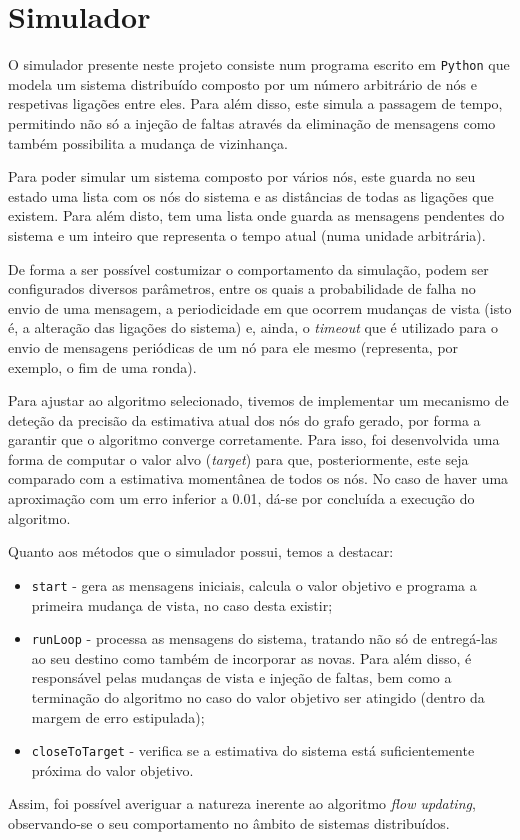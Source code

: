 \documentclass[a4paper]{report}
\begin{document}
{\let\clearpage\relax \chapter{Simulador} \label{ch:Simulator}}
\large{
	O simulador presente neste projeto consiste num programa escrito em \texttt{Python} que modela um sistema distribuído composto por um número arbitrário de nós e respetivas ligações entre eles.
	Para além disso, este simula a passagem de tempo, permitindo não só a injeção de faltas através da eliminação de mensagens como também possibilita a mudança de vizinhança.
	
	Para poder simular um sistema composto por vários nós, este guarda no seu estado uma lista com os nós do sistema e as distâncias de todas as ligações que existem. Para além disto, tem uma lista onde guarda as mensagens pendentes do sistema e um inteiro que representa o tempo atual (numa unidade arbitrária).
	
	De forma a ser possível costumizar o comportamento da simulação, podem ser configurados diversos parâmetros, entre os quais a probabilidade de falha no envio de uma mensagem, a periodicidade em que ocorrem mudanças de vista (isto é, a alteração das ligações do sistema) e, ainda, o \textit{timeout} que é utilizado para o envio de mensagens periódicas de um nó para ele mesmo (representa, por exemplo, o fim de uma ronda).
	
	Para ajustar ao algoritmo selecionado, tivemos de implementar um mecanismo de deteção da precisão da estimativa atual dos nós do grafo gerado, por forma a garantir que o algoritmo converge corretamente.
	Para isso, foi desenvolvida uma forma de computar o valor alvo (\textit{target}) para que, posteriormente, este seja comparado com a estimativa momentânea de todos os nós. No caso de haver uma aproximação com um erro inferior a 0.01, dá-se por concluída a execução do algoritmo.

	Quanto aos métodos que o simulador possui, temos a destacar:
	\begin{itemize}
		\item \texttt{start} - gera as mensagens iniciais, calcula o valor objetivo e programa a primeira mudança de vista, no caso desta existir;
		\item \texttt{runLoop} - processa as mensagens do sistema, tratando não só de entregá-las ao seu destino como também de incorporar as novas. Para além disso, é responsável pelas mudanças de vista e injeção de faltas, bem como a terminação do algoritmo no caso do valor objetivo ser atingido (dentro da margem de erro estipulada);
		\item \texttt{closeToTarget} - verifica se a estimativa do sistema está suficientemente próxima do valor objetivo.
	\end{itemize}

	Assim, foi possível averiguar a natureza inerente ao algoritmo \textit{flow updating}, observando-se o seu comportamento no âmbito de sistemas distribuídos.
}
\end{document}
